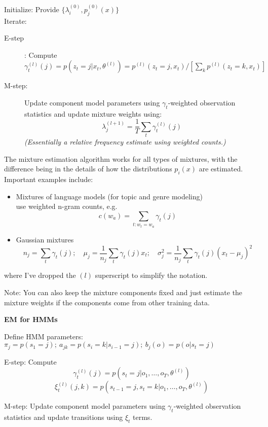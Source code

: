 \documentclass[11pt,titlepage]{article}
\begin{document}
Initialize: Provide $\{\lambda_i^{(0)},p_j^{(0)}(x)\}$\\
Iterate: 
\begin{description}
\item[E-step]: Compute $\gamma_t^{(l)}(j) = p(z_t = j|x_t,\theta^{(l)}) = 
  p^{(l)}(z_t = j,x_t)/[\sum_k p^{(l)}(z_t = k,x_t)] $

\item[M-step:] Update component model parameters using $\gamma_t$-weighted 
observation statistics and update mixture weights using:
$$\lambda_j^{(l+1)} = \frac{1}{T}\sum_t \gamma_t^{(l)}(j)$$
{\Large \sl (Essentially a relative frequency estimate using 
weighted counts.)}
\end{description}

\vskip 0.2in

The mixture estimation algorithm works for all types of mixtures, with
the difference being in the details of how the distributions $p_i(x)$
are estimated.  Important examples include:
\begin{itemize}
\item Mixtures of language models (for topic and genre modeling)\\
use weighted n-gram counts, e.g.
  $$c(w_a) = \sum_{t:w_t=w_a} \gamma_t(j)$$
\item Gaussian mixtures
$$n_j = \sum_t \gamma_t(j); \quad \mu_j=\frac{1}{n_j}\sum_t \gamma_t(j)x_t; \quad \sigma^2_j=\frac{1}{n_j}\sum_t\gamma_t(j)(x_t-\mu_j)^2$$
\end{itemize}
where I've dropped the $(l)$ superscript to simplify the notation.

\vskip 0.1in

Note: You can also keep the mixture components fixed and just estimate the mixture weights if the components come from other training data.

\clearpage

{\bf EM for HMMs}

\vskip 0.2in

Define HMM parameters: $\pi_j = p(s_1=j);\ a_{jk}=p(s_i=k|s_{i-1}=j);\
b_j(o) = p(o|s_t=j)$

\vskip 0.2in

E-step: Compute 
$$\gamma_t^{(l)}(j) = p(s_t = j|o_1,\ldots ,o_T,\theta^{(l)})$$
$$\xi_t^{(l)}(j,k) = p(s_{t-1} = j, s_{t}=k|o_1,\ldots ,o_T,\theta^{(l)})$$

M-step: Update component model parameters using $\gamma_t$-weighted 
observation statistics and update transitions using $\xi_t$ terms.
\end{document}
